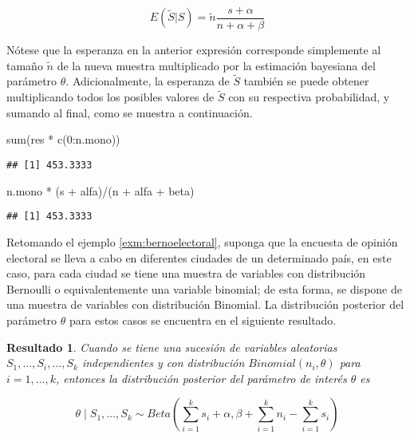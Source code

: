 \documentclass[
  spanish,
]{book}
\newenvironment{Shaded}{\begin{snugshade}}{\end{snugshade}}
\newcommand{\DecValTok}[1]{\textcolor[rgb]{0.00,0.00,0.81}{#1}}
\newcommand{\FunctionTok}[1]{\textcolor[rgb]{0.00,0.00,0.00}{#1}}
\newcommand{\NormalTok}[1]{#1}
\newcommand{\SpecialCharTok}[1]{\textcolor[rgb]{0.00,0.00,0.00}{#1}}
\newtheorem{proposition}{Resultado}[chapter]
\theoremstyle{definition}
\theoremstyle{definition}
\theoremstyle{definition}
\theoremstyle{definition}
\theoremstyle{remark}
\begin{document}
\begin{equation*}
E(\tilde{S}|S)=\tilde{n}\frac{s+\alpha}{n+\alpha+\beta}
\end{equation*}

Nótese que la esperanza en la anterior expresión corresponde simplemente
al tamaño \(\tilde{n}\) de la nueva muestra multiplicado por la
estimación bayesiana del parámetro \(\theta\). Adicionalmente, la
esperanza de \(\tilde{S}\) también se puede obtener multiplicando todos los
posibles valores de \(\tilde{S}\) con su respectiva probabilidad, y sumando
al final, como se muestra a continuación.

\begin{Shaded}
\begin{Highlighting}[]
\FunctionTok{sum}\NormalTok{(res }\SpecialCharTok{*} \FunctionTok{c}\NormalTok{(}\DecValTok{0}\SpecialCharTok{:}\NormalTok{n.mono)) }
\end{Highlighting}
\end{Shaded}

\begin{verbatim}
## [1] 453.3333
\end{verbatim}

\begin{Shaded}
\begin{Highlighting}[]
\NormalTok{n.mono }\SpecialCharTok{*}\NormalTok{ (s }\SpecialCharTok{+}\NormalTok{ alfa)}\SpecialCharTok{/}\NormalTok{(n }\SpecialCharTok{+}\NormalTok{ alfa }\SpecialCharTok{+}\NormalTok{ beta)}
\end{Highlighting}
\end{Shaded}

\begin{verbatim}
## [1] 453.3333
\end{verbatim}

Retomando el ejemplo \ref{exm:bernoelectoral}, suponga que la encuesta de opinión electoral
se lleva a cabo en diferentes ciudades de un determinado país, en este
caso, para cada ciudad se tiene una muestra de variables con
distribución Bernoulli o equivalentemente una variable binomial; de esta
forma, se dispone de una muestra de variables con distribución Binomial.
La distribución posterior del parámetro \(\theta\) para estos casos se
encuentra en el siguiente resultado.

\begin{proposition}
\protect\hypertarget{prp:postbinom}{}{\label{prp:postbinom} }Cuando se tiene una sucesión de variables aleatorias \(S_1,\ldots,S_i, \ldots,S_k\) independientes y con distribución \(Binomial(n_i,\theta)\) para \(i=1,\ldots,k\), entonces la distribución posterior del parámetro de interés \(\theta\) es

\begin{equation*}
\theta \mid S_1,\ldots,S_k \sim Beta\left(\sum_{i=1}^ks_i+\alpha,\beta+\sum_{i=1}^k n_i-\sum_{i=1}^k s_i\right)
\end{equation*}
\end{proposition}
\end{document}
